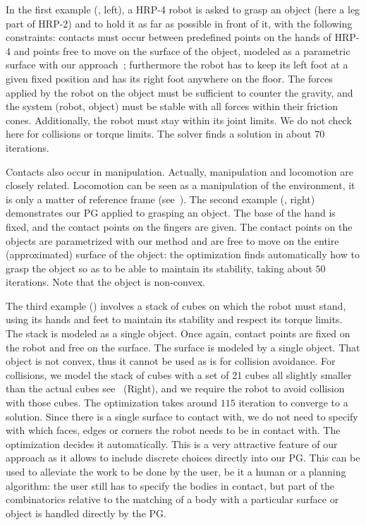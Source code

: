 In the first example (, left), a HRP-4 robot is asked to grasp an object (here a leg part of HRP-2) and to hold it as far as possible in front of it, with the following constraints: contacts must occur between predefined points on the hands of HRP-4 and points free to move on the surface of the object, modeled as a parametric surface with our approach~\cite{escande:icra:2016}; furthermore the robot has to keep its left foot at a given fixed position and has its right foot anywhere on the floor.
The forces applied by the robot on the object must be sufficient to counter the gravity, and the system (robot, object) must be stable with all forces within their friction cones.
Additionally, the robot must stay within its joint limits.
We do not check here for collisions or torque limits.
The solver finds a solution in about $70$ iterations.

Contacts also occur in manipulation.
Actually, manipulation and locomotion are closely related.
Locomotion can be seen as a manipulation of the environment, it is only a matter of reference frame (see~\cite{bouyarmane:ar:2012}).
The second example (, right) demonstrates our PG applied to grasping an object.
The base of the hand is fixed, and the contact points on the fingers are given.
The contact points on the objects are parametrized with our method and are free to move on the entire (approximated) surface of the object: the optimization finds automatically how to grasp the object so as to be able to maintain its stability, taking about $50$ iterations.
Note that the object is non-convex.

The third example () involves a stack of cubes on which the robot must stand, using its hands and feet to maintain its stability and respect its torque limits.
The stack is modeled as a single object.
Once again, contact points are fixed on the robot and free on the surface.
The surface is modeled by a single object. That object is not convex, thus it cannot be used as is for collision avoidance.
For collisions, we model the stack of cubes with a set of 21 cubes all slightly smaller than the actual cubes see~ (Right), and we require the robot to avoid collision with those cubes.
The optimization takes around $115$ iteration to converge to a solution.
Since there is a single surface to contact with, we do not need to specify with which faces, edges or corners the robot needs to be in contact with.
The optimization decides it automatically.
This is a very attractive feature of our approach as it allows to include discrete choices directly into our PG\@.
This can be used to alleviate the work to be done by the user, be it a human or a planning algorithm: the user still has to specify the bodies in contact, but part of the combinatorics relative to the matching of a body with a particular surface or object is handled directly by the PG\@.

